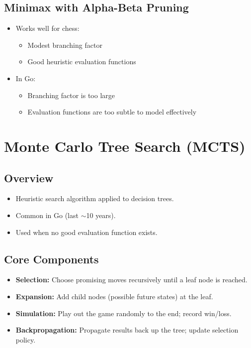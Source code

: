 \subsection{Minimax with Alpha-Beta Pruning}
\begin{itemize}
    \item Works well for chess:
    \begin{itemize}
        \item Modest branching factor
        \item Good heuristic evaluation functions
    \end{itemize}
    \item In Go:
    \begin{itemize}
        \item Branching factor is too large
        \item Evaluation functions are too subtle to model effectively
    \end{itemize}
\end{itemize}

\section{Monte Carlo Tree Search (MCTS)}

\subsection{Overview}
\begin{itemize}
    \item Heuristic search algorithm applied to decision trees.
    \item Common in Go (last $\sim$10 years).
    \item Used when no good evaluation function exists.
\end{itemize}

\subsection{Core Components}
\begin{itemize}
    \item \textbf{Selection:} Choose promising moves recursively until a leaf node is reached.
    \item \textbf{Expansion:} Add child nodes (possible future states) at the leaf.
    \item \textbf{Simulation:} Play out the game randomly to the end; record win/loss.
    \item \textbf{Backpropagation:} Propagate results back up the tree; update selection policy.
\end{itemize}

